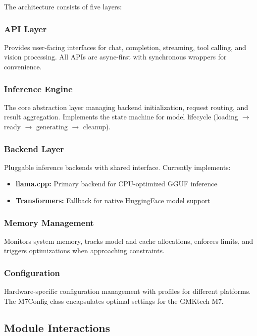 The architecture consists of five layers:

\subsubsection{API Layer}

Provides user-facing interfaces for chat, completion, streaming, tool calling, and vision processing. All APIs are async-first with synchronous wrappers for convenience.

\subsubsection{Inference Engine}

The core abstraction layer managing backend initialization, request routing, and result aggregation. Implements the state machine for model lifecycle (loading $\rightarrow$ ready $\rightarrow$ generating $\rightarrow$ cleanup).

\subsubsection{Backend Layer}

Pluggable inference backends with shared interface. Currently implements:

\begin{itemize}
    \item \textbf{llama.cpp:} Primary backend for CPU-optimized GGUF inference
    \item \textbf{Transformers:} Fallback for native HuggingFace model support
\end{itemize}

\subsubsection{Memory Management}

Monitors system memory, tracks model and cache allocations, enforces limits, and triggers optimizations when approaching constraints.

\subsubsection{Configuration}

Hardware-specific configuration management with profiles for different platforms. The M7Config class encapsulates optimal settings for the GMKtech M7.

\subsection{Module Interactions}

